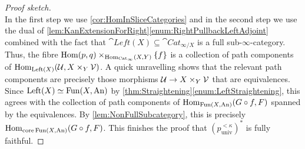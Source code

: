 \begin{proof}[Proof sketch]
\begin{equation*}
	\end{equation*}
	In the first step we use \cref{cor:HomInSliceCategories} and in the second step we use the dual of \cref{lem:KanExtensionForRight}\cref{enum:RightPullbackLeftAdjoint} combined with the fact that $\cat{Left}(X)\subseteq \cat{Cat}_{\infty/X}$ is a full sub-$\infty$-category. Thus, the fibre $\operatorname{Hom}(p,q)\times_{\operatorname{Hom}_{\mathrm{Cat}_\infty}(X,Y)}\{f\}$ is a collection of path components of $\Hom_{\cat{Left}(X)}\left(\Uu,X\times_Y\Vv\right)$. A quick unravelling shows that the relevant path components are precisely those morphisms $\mathcal{U}\rightarrow X\times_Y\mathcal{V}$ that are equivalences. Since $\mathrm{Left}(X)\simeq \operatorname{Fun}(X,\mathrm{An})$ by \cref{thm:Straightening}\cref{enum:LeftStraightening}, this agrees with the collection of path components of $\operatorname{Hom}_{\operatorname{Fun}(X,\mathrm{An})}(G\circ f,F)$ spanned by the equivalences. By \cref{lem:NonFullSubcategory}, this is precisely $\Hom_{\core \Fun(X,\cat{An})}\left(G\circ f,F\right)$. This finishes the proof that $(p_\mathrm{univ}^{<\kappa})^*$ is fully faithful.
\end{proof}
